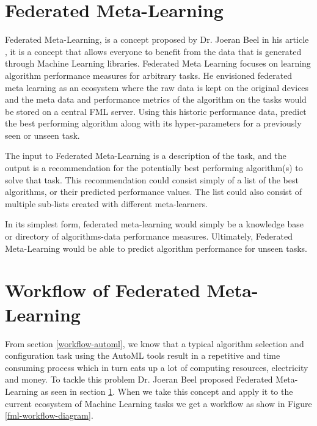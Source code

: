 

\section{Federated Meta-Learning}
\label{federated-meta-learning}
Federated Meta-Learning, is a concept proposed by Dr. Joeran Beel in his article \citep{fml}, it is a concept that allows everyone to benefit from the data that is generated through Machine Learning libraries. Federated Meta Learning focuses on learning algorithm performance measures for arbitrary tasks. He envisioned federated meta learning as an ecosystem where the raw data is kept on the original devices and the meta data and performance metrics of the algorithm on the tasks would be stored on a central FML server. Using this historic performance data, predict the best performing algorithm along with its hyper-parameters for a previously seen or unseen task.

The input to Federated Meta-Learning is a description of the task, and the output is a recommendation for the potentially best performing algorithm(s) to solve that task. This recommendation could consist simply of a list of the best algorithms, or their predicted performance values. The list could also consist of multiple sub-lists created with different meta-learners.

In its simplest form, federated meta-learning would simply be a knowledge base or directory of algorithms-data performance measures. Ultimately, Federated Meta-Learning would be able to predict algorithm performance for unseen tasks.

\section{Workflow of Federated Meta-Learning}
\label{fml-workflow}

From section \ref{workflow-automl}, we know that a typical algorithm selection and configuration task using the AutoML tools result in a repetitive and time consuming process which in turn eats up a lot of computing resources, electricity and money. To tackle this problem Dr. Joeran Beel proposed Federated Meta-Learning as seen in section \ref{federated-meta-learning}. When we take this concept and apply it to the current ecosystem of Machine Learning tasks we get a workflow as show in Figure \ref{fml-workflow-diagram}.

